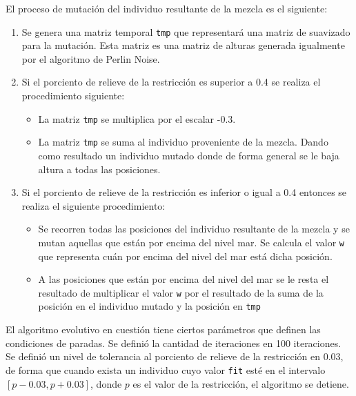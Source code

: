 El proceso de mutación del individuo resultante de la mezcla es el siguiente:

\begin{enumerate}
	\item Se genera una matriz temporal \verb|tmp| que representará una matriz de suavizado para la mutación. Esta matriz es una matriz de alturas generada igualmente por el algoritmo de Perlin Noise.
	\item Si el porciento de relieve de la restricción es superior a 0.4 se realiza el procedimiento siguiente:
	\begin{itemize}
		\item La matriz \verb|tmp| se multiplica por el escalar -0.3.
		\item La matriz \verb|tmp| se suma al individuo proveniente de la mezcla. Dando como resultado un individuo mutado donde de forma general se le baja altura a todas las posiciones.  
	\end{itemize}
	\item Si el porciento de relieve de la restricción es inferior o igual a 0.4 entonces se realiza el siguiente procedimiento: 
	\begin{itemize}
		\item Se recorren todas las posiciones del individuo resultante de la mezcla y se mutan aquellas que están por encima del nivel mar. Se calcula el valor \verb|w| que representa cuán por encima del nivel del mar está dicha posición.
		\item A las posiciones que están por encima del nivel del mar se le resta el resultado de multiplicar el valor \verb|w| por el resultado de la suma de la posición en el individuo mutado y  la posición en \verb|tmp|
	\end{itemize}
\end{enumerate}

El algoritmo evolutivo en cuestión tiene ciertos parámetros que definen las condiciones de paradas. Se definió la cantidad de iteraciones en 100 iteraciones. Se definió un nivel de tolerancia al porciento de relieve de la restricción en 0.03, de forma que cuando exista un individuo cuyo valor \verb|fit| esté en el intervalo $[p - 0.03, p + 0.03]$, donde $p$ es el valor de la restricción, el algoritmo se detiene.

